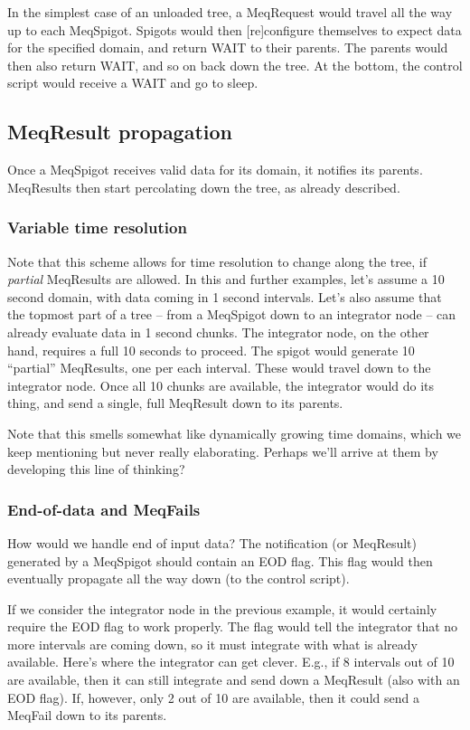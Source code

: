 \documentclass[12pt]{article}
\begin{document}
  In the simplest case of an unloaded tree, a MeqRequest would travel all the
  way up to each MeqSpigot. Spigots would then [re]configure themselves to
  expect data for the specified domain, and return WAIT to their parents. The
  parents would then also return WAIT, and so on back down the tree. At the
  bottom, the control script would receive a WAIT and go to sleep.

\subsection{MeqResult propagation}

  Once a MeqSpigot receives valid data for its domain, it notifies its
  parents. MeqResults then start percolating down the tree, as already
  described.
  
\subsubsection{Variable time resolution}

  Note that this scheme allows for time resolution to change along the tree, if
  {\em partial} MeqResults are allowed. In this and further examples, let's
  assume a 10 second domain, with data coming in 1 second intervals. Let's also
  assume that the topmost part of a tree -- from a MeqSpigot down to an
  integrator node -- can already evaluate data in 1 second chunks. The
  integrator node, on the other hand, requires a full 10 seconds to proceed.
  The spigot would generate 10 ``partial'' MeqResults, one per each interval.
  These would travel down to the integrator node. Once all 10 chunks are
  available, the integrator would do its thing, and send a single, full
  MeqResult down to its parents.
  
  Note that this smells somewhat like dynamically growing time domains, which
  we keep mentioning but never really elaborating. Perhaps we'll arrive at them
  by developing this line of thinking?

\subsubsection{End-of-data and MeqFails}

  How would we handle end of input data? The notification (or MeqResult)
  generated by a MeqSpigot should contain an EOD flag. This flag would then
  eventually propagate all the way down (to the control script).
  
  If we consider the integrator node in the previous example, it would
  certainly require the EOD flag to work properly. The flag would tell the
  integrator that no more intervals are coming down, so it must integrate with
  what is already available. Here's where the integrator can get clever. E.g.,
  if 8 intervals out of 10 are available, then it can still integrate and send
  down a MeqResult (also with an EOD flag). If, however, only 2 out of 10 are
  available, then it could send a MeqFail down to its parents.
\end{document}
